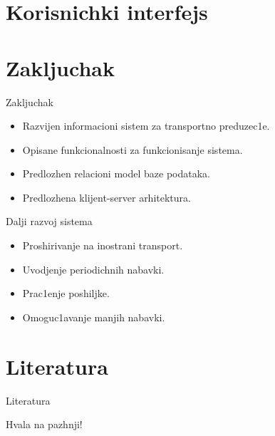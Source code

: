 \documentclass[11pt]{beamer}
\begin{document}
\section{Korisnichki interfejs}


\section{Zakljuchak}
\begin{frame}{Zakljuchak}
    \begin{itemize}
        \item Razvijen informacioni sistem za transportno preduzec1e.
        \item Opisane funkcionalnosti za funkcionisanje sistema.
        \item Predlozhen relacioni model baze podataka.
        \item Predlozhena klijent-server arhitektura.
    \end{itemize}
\end{frame}

\begin{frame}{Dalji razvoj sistema}
    \begin{itemize}
        \item Proshirivanje na inostrani transport.
        
        \medskip
        
        \item Uvodjenje periodichnih nabavki.
        
        \medskip
        \item Prac1enje poshiljke.
        \medskip
        \item Omoguc1avanje manjih nabavki.
    \end{itemize}
\end{frame}

\section{Literatura}

\begin{frame}{Literatura}
    
\end{frame}

\begin{frame}
\begin{center}
    Hvala na pazhnji!
\end{center}

\end{frame}
\end{document}
